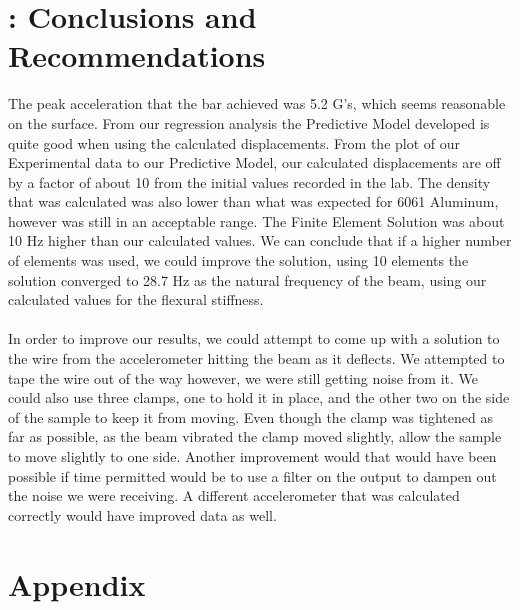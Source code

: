 \documentclass[a4paper, 12pt]{article}
\begin{document}
\section{: Conclusions and Recommendations}
The peak acceleration that the bar achieved was 5.2 G's, which seems reasonable on the surface. From our regression analysis the Predictive Model developed is quite good when using the calculated displacements. From the plot of our Experimental data to our Predictive Model, our calculated displacements are off by a factor of about 10 from the initial values recorded in the lab. The density that was calculated was also lower than what was expected for 6061 Aluminum, however was still in an acceptable range. The Finite Element Solution was about 10 Hz higher than our calculated values. We can conclude that if a higher number of elements was used, we could improve the solution, using 10 elements the solution converged to 28.7 Hz as the natural frequency of the beam, using our calculated values for the flexural stiffness.\\\\
In order to improve our results, we could attempt to come up with a solution to the wire from the accelerometer hitting the beam as it deflects. We attempted to tape the wire out of the way however, we were still getting noise from it. We could also use three clamps, one to hold it in place, and the other two on the side of the sample to keep it from moving. Even though the clamp was tightened as far as possible, as the beam vibrated the clamp moved slightly, allow the sample to move slightly to one side. Another improvement would that would have been possible if time permitted would be to use a filter on the output to dampen out the noise we were receiving. A different accelerometer that was calculated correctly would have improved data as well.

\appendix
\section*{Appendix}
\end{document}

